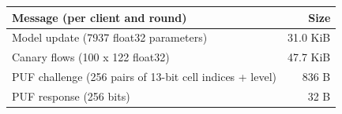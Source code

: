 \begin{tabular}{lr}
\toprule
Message (per client and round) & Size \\
\midrule
Model update (7937 float32 parameters) & 31.0 KiB \\
Canary flows (100 x 122 float32) & 47.7 KiB \\
PUF challenge (256 pairs of 13-bit cell indices + level) & 836 B \\
PUF response (256 bits) & 32 B \\
\bottomrule
\end{tabular}
